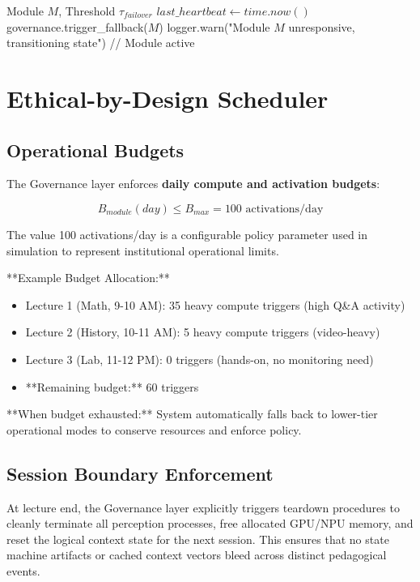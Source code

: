 \documentclass[conference]{IEEEtran}
\begin{document}
\begin{algorithm}[H]
\caption{Module Health Interface}
\begin{algorithmic}[1]
\REQUIRE Module $M$, Threshold $\tau_{failover}$
\STATE $last\_heartbeat \leftarrow time.now()$
\STATE governance.trigger\_fallback($M$)
\STATE logger.warn("Module $M$ unresponsive, transitioning state")
\ELSE
\STATE // Module active
\ENDIF
\ENDWHILE
\end{algorithmic}
\label{alg:watchdog}
\end{algorithm}

\section{Ethical-by-Design Scheduler}

\subsection{Operational Budgets}
The Governance layer enforces \textbf{daily compute and activation budgets}:

\begin{equation}
B_{module}(day) \leq B_{max} = 100 \text{ activations/day}
\end{equation}

The value 100 activations/day is a configurable policy parameter used in simulation to represent institutional operational limits.

**Example Budget Allocation:**
\begin{itemize}
    \item Lecture 1 (Math, 9-10 AM): 35 heavy compute triggers (high Q\&A activity)
    \item Lecture 2 (History, 10-11 AM): 5 heavy compute triggers (video-heavy)
    \item Lecture 3 (Lab, 11-12 PM): 0 triggers (hands-on, no monitoring need)
    \item **Remaining budget:** 60 triggers
\end{itemize}

**When budget exhausted:** System automatically falls back to lower-tier operational modes to conserve resources and enforce policy.

\subsection{Session Boundary Enforcement}
At lecture end, the Governance layer explicitly triggers teardown procedures to cleanly terminate all perception processes, free allocated GPU/NPU memory, and reset the logical context state for the next session. This ensures that no state machine artifacts or cached context vectors bleed across distinct pedagogical events.
\end{document}
